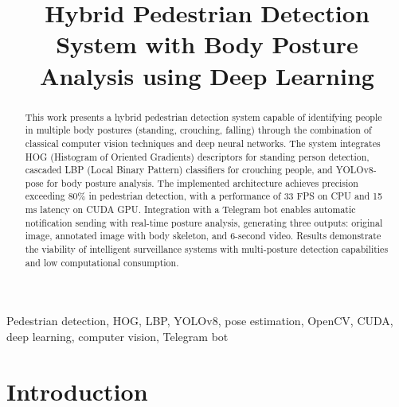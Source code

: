 \documentclass[conference]{IEEEtran}
\begin{document}
\title{Hybrid Pedestrian Detection System with Body Posture Analysis using Deep Learning\\
{\footnotesize \textsuperscript{}}
}

\author{
\and
{}
}

\maketitle

\begin{abstract}
This work presents a hybrid pedestrian detection system capable of identifying people in multiple body postures (standing, crouching, falling) through the combination of classical computer vision techniques and deep neural networks. The system integrates HOG (Histogram of Oriented Gradients) descriptors for standing person detection, cascaded LBP (Local Binary Pattern) classifiers for crouching people, and YOLOv8-pose for body posture analysis. The implemented architecture achieves precision exceeding 80\% in pedestrian detection, with a performance of 33 FPS on CPU and 15 ms latency on CUDA GPU. Integration with a Telegram bot enables automatic notification sending with real-time posture analysis, generating three outputs: original image, annotated image with body skeleton, and 6-second video. Results demonstrate the viability of intelligent surveillance systems with multi-posture detection capabilities and low computational consumption.
\end{abstract}

\begin{IEEEkeywords}
Pedestrian detection, HOG, LBP, YOLOv8, pose estimation, OpenCV, CUDA, deep learning, computer vision, Telegram bot
\end{IEEEkeywords}

\section{Introduction}
\end{document}
